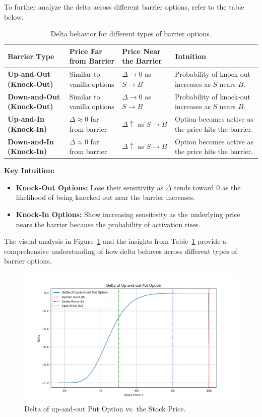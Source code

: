 To further analyze the delta across different barrier options, refer to the table below:


\begin{center}
	\begin{table}[H]
		\begin{tabular}{ | m{4em} | m{1.4cm}| m{1.4cm} | m{1.4cm}|} 
			\hline
			\textbf{Barrier Type}         & \textbf{Price Far from Barrier} & \textbf{Price Near the Barrier} & \textbf{Intuition}  \\
			\hline
			\textbf{Up-and-Out (Knock-Out)} & Similar to vanilla options     & $\Delta \to 0$ as $S \to B$  & Probability of knock-out increases as $S$ nears $B$. \\ 
			\textbf{Down-and-Out (Knock-Out)} & Similar to vanilla options     & $\Delta \to 0$ as $S \to B$  & Probability of knock-out increases as $S$ nears $B$. \\ 
			\hline
			\textbf{Up-and-In (Knock-In)}    & $\Delta \approx 0$ far from barrier   & $\Delta \uparrow$ as $S \to B$  & Option becomes active as the price hits the barrier. \\ 
			\hline
			\textbf{Down-and-In (Knock-In)}  & $\Delta \approx 0$ far from barrier   & $\Delta \uparrow$ as $S \to B$  & Option becomes active as the price hits the barrier. \\ 
			\hline
		\end{tabular}
		\caption{Delta behavior for different types of barrier options.}
		\label{tab:delta_barrier_options}
	\end{table}
\end{center}

\textbf{Key Intuition:}
\begin{itemize}
    \item \textbf{Knock-Out Options:} Lose their sensitivity as $\Delta$ tends toward $0$ as the likelihood of being knocked out near the barrier increases.
    \item \textbf{Knock-In Options:} Show increasing sensitivity as the underlying price nears the barrier because the probability of activation rises.
\end{itemize}

The visual analysis in Figure~\ref{fig:delta_upout} and the insights from Table~\ref{tab:delta_barrier_options} provide a comprehensive understanding of how delta behaves across different types of barrier options.
\begin{figure}[h]
    \centering
    \includegraphics[width=.65\linewidth]{content/images/delta_upout.png}
    \caption{Delta of up-and-out Put Option vs. the Stock Price.}
    \label{fig:delta_upout}
\end{figure}

